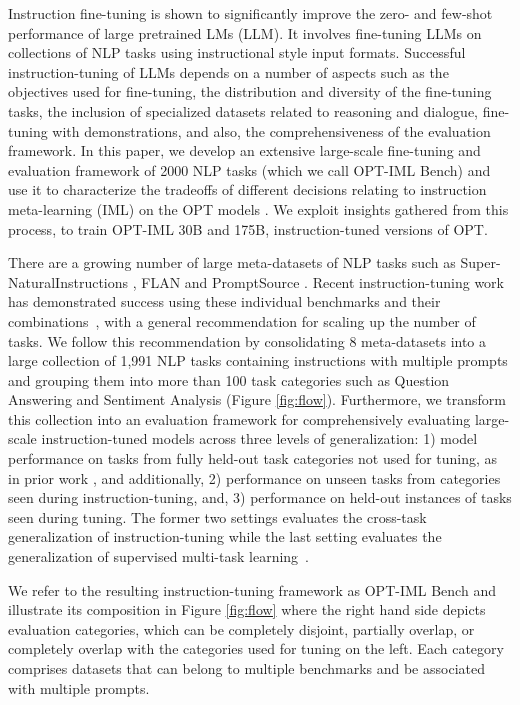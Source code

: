 Instruction fine-tuning is shown \citep{wei2021flan,sanh2021t0,chung2022scaling} to significantly improve the zero- and few-shot performance of large pretrained LMs (LLM). It involves fine-tuning LLMs on collections of NLP tasks using instructional style input formats. Successful instruction-tuning of LLMs depends on a number of aspects such as the objectives used for fine-tuning, the distribution and diversity of the fine-tuning tasks, the inclusion of specialized datasets related to reasoning and dialogue, fine-tuning with demonstrations, and also, the comprehensiveness of the evaluation framework. In this paper, we develop an extensive large-scale fine-tuning and evaluation framework of 2000 NLP tasks (which we call OPT-IML Bench) and use it to characterize the tradeoffs of different decisions relating to instruction meta-learning (IML) on the OPT models \citep{zhang2022opt}. We exploit insights gathered from this process, to train OPT-IML 30B and 175B, instruction-tuned versions of OPT.

There are a growing number of large meta-datasets of NLP tasks such as Super-NaturalInstructions \citep{wang2022niv2}, FLAN \citep{wei2021flan} and PromptSource \citep{sanh2021t0}. Recent instruction-tuning work has demonstrated success using these individual benchmarks and their combinations~\citep{chung2022flanpalm}, with a general recommendation for scaling up the number of tasks. We follow this recommendation by consolidating 8 meta-datasets into a large collection of 1,991 NLP tasks containing instructions with multiple prompts and grouping them into more than 100 task categories such as Question Answering and Sentiment Analysis (Figure \ref{fig:flow}). Furthermore, we transform this collection into an evaluation framework for comprehensively evaluating large-scale instruction-tuned models across three levels of generalization: 1) model performance on tasks from fully held-out task categories not used for tuning, as in prior work \citep{wei2021flan,sanh2021t0}, and additionally, 2) performance on unseen tasks from categories seen during instruction-tuning, and, 3) performance on held-out instances of tasks seen during tuning. The former two settings evaluates the cross-task generalization of instruction-tuning while the last setting evaluates the generalization of supervised multi-task learning~\citep{mccann2018decathlon}.

We refer to the resulting instruction-tuning framework as OPT-IML Bench and illustrate its composition in Figure \ref{fig:flow} where the right hand side depicts evaluation categories, which can be completely disjoint, partially overlap, or completely overlap with the categories used for tuning on the left. Each category comprises datasets that can belong to multiple benchmarks and be associated with multiple prompts.

